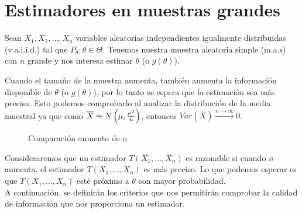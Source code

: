 \section{Estimadores en muestras grandes}

Sean $X_1, X_2, \dots, X_n$ variables aleatorias independientes igualmente distribuidas (v.a.i.i.d.) tal que $P_\theta:\theta \in \Theta$. Tenemos nuestra muestra aleatoria simple (m.a.s) con $n$ grande y nos interesa estimar $\theta$ (o $g(\theta)$).

Cuando el tamaño de la muestra aumenta, también aumenta la información disponible de $\theta$ (o $g(\theta)$), por lo tanto se espera que la estimación sea más precisa. Esto podemos comprobarlo al analizar la distribución de la media muestral ya que como $\overline{X}\thicksim N\left(\mu, \frac{\sigma^2}{n}\right)$, entonces $Var(\overline{X}) \xrightarrow{n \rightarrow \infty} 0$.

\begin{figure}[h!]
    \begin{center}
        \caption{Comparación aumento de n}
    \end{center}
\end{figure}

Consideraremos que un estimador $T(X_1, \dots, X_n)$ es razonable si cuando $n$ aumenta, el estimador $T(X_1, \dots, X_n)$ es más preciso. Lo que podemos esperar es que $T(X_1, \dots, X_n)$ esté próximo a $\theta$ con mayor probabilidad. \\

A continuación, se definirán los criterios que nos permitirán comprobar la calidad de información que nos proporciona un estimador.

